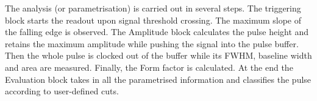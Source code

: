 \documentclass[12pt]{packages/mytustyle}  %
\begin{document}

The analysis (or parametrisation) is carried out in several steps. The triggering block starts the readout upon signal threshold crossing. The maximum slope of the falling edge is observed. The Amplitude block calculates the pulse height and retains the maximum amplitude while pushing the signal into the pulse buffer. Then the whole pulse is clocked out of the buffer while its FWHM, baseline width and area are measured. Finally, the Form factor is calculated. At the end the Evaluation block takes in all the parametrised information and classifies the pulse according to user-defined cuts. 
\end{document}
